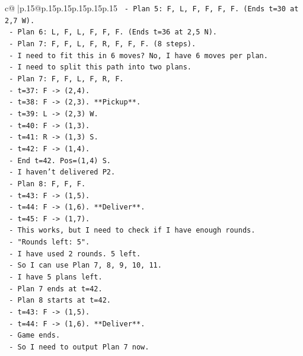 \documentclass{article}
\begin{document}
{\begin{supertabular}{c@{$\;$}|p{.15\linewidth}@{}p{.15\linewidth}p{.15\linewidth}p{.15\linewidth}p{.15\linewidth}p{.15\linewidth}}
{{{\texttt{  {-} Plan 5: F, L, F, F, F, F. (Ends t=30 at 2,7 W).} \\
\texttt{  {-} Plan 6: L, F, L, F, F, F. (Ends t=36 at 2,5 N).} \\
\texttt{  {-} Plan 7: F, F, L, F, R, F, F, F. (8 steps).} \\
\texttt{    {-} I need to fit this in 6 moves? No, I have 6 moves per plan.} \\
\texttt{    {-} I need to split this path into two plans.} \\
\texttt{    {-} Plan 7: F, F, L, F, R, F.} \\
\texttt{      {-} t=37: F {-}> (2,4).} \\
\texttt{      {-} t=38: F {-}> (2,3). **Pickup**.} \\
\texttt{      {-} t=39: L {-}> (2,3) W.} \\
\texttt{      {-} t=40: F {-}> (1,3).} \\
\texttt{      {-} t=41: R {-}> (1,3) S.} \\
\texttt{      {-} t=42: F {-}> (1,4).} \\
\texttt{      {-} End t=42. Pos=(1,4) S.} \\
\texttt{      {-} I haven't delivered P2.} \\
\texttt{    {-} Plan 8: F, F, F.} \\
\texttt{      {-} t=43: F {-}> (1,5).} \\
\texttt{      {-} t=44: F {-}> (1,6). **Deliver**.} \\
\texttt{      {-} t=45: F {-}> (1,7).} \\
\texttt{      {-} This works, but I need to check if I have enough rounds.} \\
\texttt{      {-} "Rounds left: 5".} \\
\texttt{      {-} I have used 2 rounds. 5 left.} \\
\texttt{      {-} So I can use Plan 7, 8, 9, 10, 11.} \\
\texttt{      {-} I have 5 plans left.} \\
\texttt{      {-} Plan 7 ends at t=42.} \\
\texttt{      {-} Plan 8 starts at t=42.} \\
\texttt{      {-} t=43: F {-}> (1,5).} \\
\texttt{      {-} t=44: F {-}> (1,6). **Deliver**.} \\
\texttt{      {-} Game ends.} \\
\texttt{      {-} So I need to output Plan 7 now.} \\
}}}
\end{supertabular}}
\end{document}
